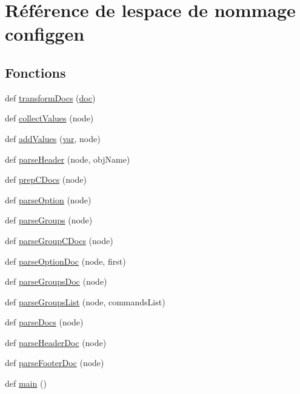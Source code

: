 \hypertarget{namespaceconfiggen}{}\section{Référence de l\textquotesingle{}espace de nommage configgen}
\label{namespaceconfiggen}
\subsection*{Fonctions}
\begin{DoxyCompactItemize}
\item 
def \hyperlink{namespaceconfiggen_a1aa384729104723427a5c2afe66ab0b2}{transform\+Docs} (\hyperlink{vhdljjparser_8cpp_a9910424bf5401d657c3b3fdff6fcc152}{doc})
\item 
def \hyperlink{namespaceconfiggen_acc6dbddb7fc52ab8cd0d8737a0b618b8}{collect\+Values} (node)
\item 
def \hyperlink{namespaceconfiggen_a7a227afa758ac4789a7fe86e6ed63322}{add\+Values} (\hyperlink{018__def_8c_a335628f2e9085305224b4f9cc6e95ed5}{var}, node)
\item 
def \hyperlink{namespaceconfiggen_a89944f597d3d36a9be85612e67b53b4a}{parse\+Header} (node, obj\+Name)
\item 
def \hyperlink{namespaceconfiggen_ab7624da01271ce9c6632beecf9f496dc}{prep\+C\+Docs} (node)
\item 
def \hyperlink{namespaceconfiggen_ad715e0b2955d5bc84b165b5405539419}{parse\+Option} (node)
\item 
def \hyperlink{namespaceconfiggen_aac4adaa80ffb583540321cb13371d8f7}{parse\+Groups} (node)
\item 
def \hyperlink{namespaceconfiggen_a5be363aba387403ffd797ab80a7ab137}{parse\+Group\+C\+Docs} (node)
\item 
def \hyperlink{namespaceconfiggen_a083ac0a134f63ac0207e211fc763e9ca}{parse\+Option\+Doc} (node, first)
\item 
def \hyperlink{namespaceconfiggen_ac53ed8bfd08144408875e221a3043b79}{parse\+Groups\+Doc} (node)
\item 
def \hyperlink{namespaceconfiggen_af948e892d3021895a3424f166dd8a33b}{parse\+Groups\+List} (node, commands\+List)
\item 
def \hyperlink{namespaceconfiggen_a4e29fa959659f5553d5607d34bfda454}{parse\+Docs} (node)
\item 
def \hyperlink{namespaceconfiggen_a6053c07fa9f09168e6d72d0bf59d883f}{parse\+Header\+Doc} (node)
\item 
def \hyperlink{namespaceconfiggen_a12be94c7982a6a098cb7bc151cdf17a4}{parse\+Footer\+Doc} (node)
\item 
def \hyperlink{namespaceconfiggen_aa979b4afff14aa3f59931833d74f3efa}{main} ()
\end{DoxyCompactItemize}


